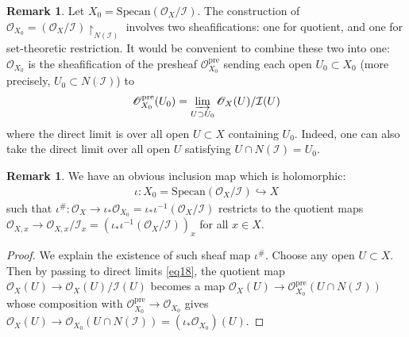 \documentclass[12pt,b5paper,notitlepage]{report}
\theoremstyle{definition}
\newtheorem{rem}[df]{Remark}
\theoremstyle{plain}
\newcommand{\mc}{\mathcal}
\newcommand{\scr}{\mathscr}
\newcommand{\Specan}{\mathrm{Specan}}
\newcommand{\uph}{\upharpoonright}
\newcommand{\pre}{\mathrm{pre}}
\numberwithin{equation}{section}
\begin{document}
\begin{rem}\label{lb10}
Let $X_0=\Specan(\scr O_X/\mc I)$. The construction of $\scr O_{X_0}=(\scr O_X/\mc I)\uph_{N(\mc I)}$ involves two sheafifications: one for quotient, and one for set-theoretic restriction. It would be convenient to combine these two into one: $\scr O_{X_0}$ is the sheafification of the presheaf $\scr O_{X_0}^\pre$ sending each open $U_0\subset X_0$ (more precisely, $U_0\subset N(\mc I)$) to 
\begin{align}
\scr O_{X_0}^\pre(U_0)=\varinjlim_{U\supset U_0}\scr O_X(U)/\mc I(U)\label{eq18}
\end{align}
where the direct limit is over all open $U\subset X$ containing $U_0$. Indeed, one can also take the direct limit over all open $U$ satisfying $U\cap N(\mc I)=U_0$.
\end{rem}

\begin{rem}
We have an obvious inclusion map which is holomorphic:
\begin{gather*}
\iota:X_0=\Specan(\scr O_X/\mc I)\hookrightarrow X
\end{gather*}
such that $\iota^\#:\scr O_X\rightarrow\iota_*\scr O_{X_0}=\iota_*\iota^{-1}(\scr O_X/\mc I)$ restricts to the quotient maps $\scr O_{X,x}\rightarrow\scr O_{X,x}/\mc I_x=(\iota_*\iota^{-1}(\scr O_X/\mc I))_x$ for all $x\in X$.
\end{rem}

\begin{proof}
We explain the existence of such sheaf map $\iota^\#$. Choose any open $U\subset X$. Then by passing to direct limits \eqref{eq18}, the quotient map $\scr O_X(U)\rightarrow\scr O_X(U)/\mc I(U)$ becomes a map $\scr O_X(U)\rightarrow\scr O_{X_0}^\pre(U\cap N(\mc I))$ whose composition with $\scr O_{X_0}^\pre\rightarrow\scr O_{X_0}$ gives $\scr O_X(U)\rightarrow\scr O_{X_0}(U\cap N(\mc I))=(\iota_*\scr O_{X_0})(U)$. 
\end{proof}
\end{document}
